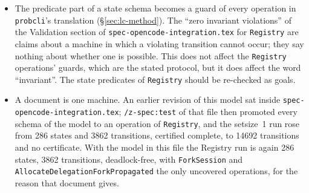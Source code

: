\documentclass[a4paper,10pt,fleqn]{article}
\newcommand{\field}[1]{\texttt{#1}}
\begin{document}
\begin{itemize}
  \item The predicate part of a state schema becomes a guard of every
    operation in \texttt{probcli}'s translation (\S\ref{sec:lc-method}). The
    ``zero invariant violations'' of the Validation section of
    \texttt{spec-opencode-integration.tex} for \field{Registry} are claims
    about a machine in which a violating transition cannot occur; they say
    nothing about whether one is possible. This does not affect the
    \field{Registry} operations' guards, which are the stated protocol, but
    it does affect the word ``invariant''. The state predicates of
    \field{Registry} should be re-checked as goals.
  \item A document is one machine. An earlier revision of this model sat
    inside \texttt{spec-opencode-integration.tex}; \texttt{/z-spec:test} of
    that file then promoted every schema of the model to an operation of
    \field{Registry}, and the setsize~1 run rose from 286 states and 3862
    transitions, certified complete, to 14692 transitions and no
    certificate. With the model in this file the Registry run is again
    286 states, 3862 transitions, deadlock-free, with
    \field{ForkSession} and \field{AllocateDelegationForkPropagated} the
    only uncovered operations, for the reason that document gives.
\end{itemize}
\end{document}
